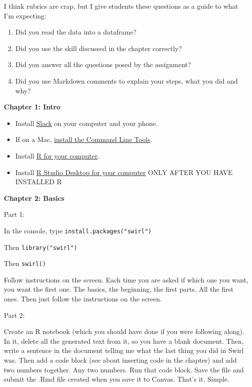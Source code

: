 \documentclass[]{book}
\providecommand{\tightlist}{%
  \setlength{\itemsep}{0pt}\setlength{\parskip}{0pt}}
\begin{document}
I think rubrics are crap, but I give students these questions as a guide to what I'm expecting:

\begin{enumerate}
\def\labelenumi{\arabic{enumi}.}
\tightlist
\item
  Did you read the data into a dataframe?
\item
  Did you use the skill discussed in the chapter correctly?
\item
  Did you answer all the questions posed by the assignment?
\item
  Did you use Markdown comments to explain your steps, what you did and why?
\end{enumerate}

\textbf{Chapter 1: Intro}

\begin{itemize}
\tightlist
\item
  Install \href{https://slack.com/get}{Slack} on your computer and your phone.
\item
  If on a Mac, \href{http://osxdaily.com/2014/02/12/install-command-line-tools-mac-os-x/}{install the Command Line Tools}.
\item
  Install \href{https://rweb.crmda.ku.edu/cran/}{R for your computer}.
\item
  Install \href{https://www.rstudio.com/products/rstudio/download/\#download}{R Studio Desktop for your computer} ONLY AFTER YOU HAVE INSTALLED R
\end{itemize}

\textbf{Chapter 2: Basics}

Part 1:

In the console, type \texttt{install.packages("swirl")}

Then \texttt{library("swirl")}

Then \texttt{swirl()}

Follow instructions on the screen. Each time you are asked if which one you want, you want the first one. The basics, the beginning, the first parts. All the first ones. Then just follow the instructions on the screen.

Part 2:

Create an R notebook (which you should have done if you were following along). In it, delete all the generated text from it, so you have a blank document. Then, write a sentence in the document telling me what the last thing you did in Swirl was. Then add a code block (see about inserting code in the chapter) and add two numbers together. Any two numbers. Run that code block. Save the file and submit the .Rmd file created when you save it to Canvas. That's it. Simple.
\end{document}
